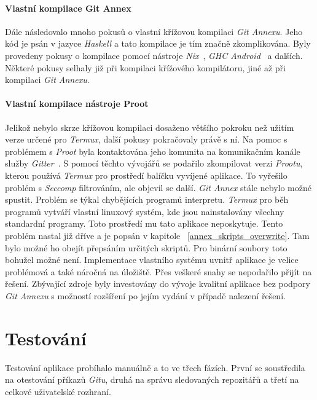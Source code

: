     \subsubsection{Vlastní kompilace Git Annex}
    Dále následovalo mnoho pokusů o vlastní křížovou kompilaci \emph{Git Annexu}. Jeho kód je psán v jazyce \emph{Haskell} a tato kompilace je tím značně zkomplikována. Byly provedeny pokusy o kompilace pomocí nástroje \emph{Nix}~, \emph{GHC Android}~ a dalších. Některé pokusy selhaly již při kompilaci křížového kompilátoru, jiné až při kompilaci \emph{Git Annexu}.

    \subsubsection{Vlastní kompilace nástroje Proot}
    Jelikož nebylo skrze křížovou kompilaci dosaženo většího pokroku než užitím verze určené pro \emph{Termux}, další pokusy pokračovaly právě s ní. Na pomoc s problémem s \emph{Proot} byla kontaktována jeho komunita na komunikačním kanále služby \emph{Gitter}~. S pomocí těchto vývojářů se podařilo zkompilovat verzi \emph{Prootu}, kterou používá \emph{Termux} pro prostředí balíčku vyvíjené aplikace. To vyřešilo problém s \emph{Seccomp} filtrováním, ale objevil se další. \emph{Git Annex} stále nebylo možné spustit. Problém se týkal chybějících programů interpretu. \emph{Termux} pro běh programů vytváří vlastní linuxový systém, kde jsou nainstalovány všechny standardní programy. Toto prostředí mu tato aplikace neposkytuje. Tento problém nastal již dříve a je popsán v kapitole ~\ref{annex_skripts_overwrite}. Tam bylo možné ho obejít přepsáním určitých skriptů. Pro binární soubory toto bohužel možné není. Implementace vlastního systému uvnitř aplikace je velice problémová a také náročná na úložiště. Přes veškeré snahy se nepodařilo přijít na řešení. Zbývající zdroje byly investovány do vývoje kvalitní aplikace bez podpory \emph{Git Annexu} s možností rozšíření po jejím vydání v případě nalezení řešení.

\chapter{Testování}
Testování aplikace probíhalo manuálně a to ve třech fázích. První se soustředila na otestování příkazů \emph{Gitu}, druhá na správu sledovaných repozitářů a třetí na celkové uživatelské rozhraní.

